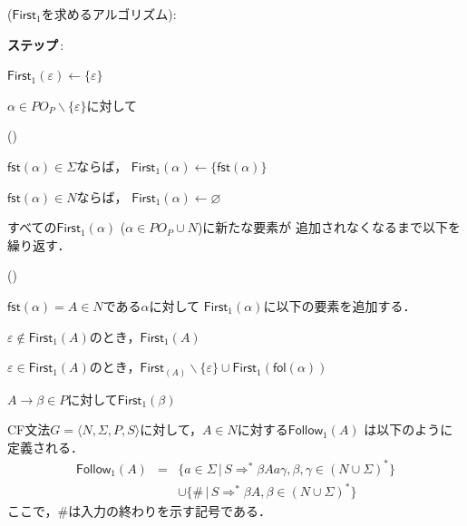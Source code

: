 \documentclass[dvipdfmx,a4j]{jbook}
\newcounter{coffee}
\newcounter{bean}
\begin{document}
\begin{Alg}\mbox{\rm ($\mathsf{First}_1$を求めるアルゴリズム):}
  \begin{list}{{\bf ステップ}\,{\rm{}:}}{}
    \item $\mathsf{First}_1(\varepsilon)\leftarrow\{\varepsilon\}$
    \item $\alpha\in PO_P\backslash\{\varepsilon\}$に対して
    \begin{list}{()}{}
      \item $\mathsf{fst}(\alpha)\in\Sigma$ならば，
      $\mathsf{First}_1(\alpha)\leftarrow \{\mathsf{fst}(\alpha)\}$
      \item $\mathsf{fst}(\alpha)\in N$ならば，
      $\mathsf{First}_1(\alpha)\leftarrow \varnothing$
    \end{list}
    \item すべての$\mathsf{First}_1(\alpha)$ ($\alpha\in PO_P\cup N$)に新たな要素が
    追加されなくなるまで以下を繰り返す．
    \begin{list}{()}{}
      \item $\mathsf{fst}(\alpha)=A\in N$である$\alpha$に対して
      $\mathsf{First}_1(\alpha)$に以下の要素を追加する．
      \begin{list}{}{}
        \item $\varepsilon\notin\mathsf{First}_1(A)$のとき，$\mathsf{First}_1(A)$
        \item $\varepsilon\in\mathsf{First}_1(A)$のとき，$\mathsf{First}_(A)\backslash\{\varepsilon\}\cup\mathsf{First}_1(\mathsf{fol}(\alpha))$
      \end{list}
    \item $A\rightarrow\beta\in P$に対して$\mathsf{First}_1(\beta)$
    \end{list}
  \end{list}
\end{Alg}

\begin{Def}
  CF文法$G=\langle N,\Sigma,P,S\rangle$に対して，$A\in N$に対する$\mathsf{Follow}_1(A)$
  は以下のように定義される．
  \[\begin{array}{rcl}
  \mathsf{Follow}_1(A) & = & \{a\in\Sigma\,|\,S\Rightarrow^\ast\beta Aa\gamma,\beta,\gamma\in(N\cup\Sigma)^\ast\}\\
  & & \cup\{\#\,|\,S\Rightarrow^\ast\beta A, \beta\in(N\cup\Sigma)^\ast\}
  \end{array}
  \]
  ここで，$\#$は入力の終わりを示す記号である．
\end{Def}
\end{document}
